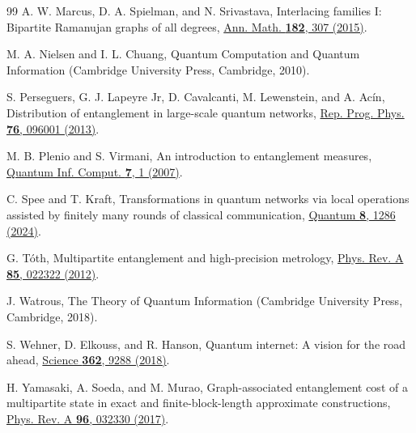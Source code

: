 \documentclass[a4paper,onecolumn,accepted=2024-12-14]{quantumarticle}
\theoremstyle{plain}
\begin{document}
\begin{thebibliography}{99}
 A. W. Marcus, D. A. Spielman, and N. Srivastava, Interlacing families I: Bipartite Ramanujan graphs of all degrees, \href{https://doi.org/10.4007/annals.2015.182.1.7}{Ann. Math. \textbf{182}, 307 (2015)}.
    
 M. A. Nielsen and I. L. Chuang, Quantum Computation and Quantum Information (Cambridge University Press, Cambridge, 2010).

 S. Perseguers, G. J. Lapeyre Jr, D. Cavalcanti, M. Lewenstein, and A. Ac\'{i}n, Distribution of entanglement in large-scale quantum networks, \href{https://doi.org/10.1088/0034-4885/76/9/096001}{Rep. Prog. Phys. \textbf{76}, 096001 (2013)}.
    
 M. B. Plenio and S. Virmani, An introduction to entanglement measures, \href{https://doi.org/10.26421/QIC7.1-2-1}{Quantum Inf. Comput. \textbf{7}, 1 (2007)}.

 C. Spee and T. Kraft, Transformations in quantum networks via local operations assisted by finitely many rounds of classical communication, \href{https://doi.org/10.22331/q-2024-03-14-1286}{Quantum \textbf{8}, 1286 (2024)}.
    
 G. T\'{o}th, Multipartite entanglement and high-precision metrology, \href{https://doi.org/10.1103/PhysRevA.85.022322}{Phys. Rev. A \textbf{85}, 022322 (2012)}.

 J. Watrous, The Theory of Quantum Information (Cambridge University Press, Cambridge, 2018).

 S. Wehner, D. Elkouss, and R. Hanson, Quantum internet: A vision for the road ahead, \href{https://doi.org/10.1126/science.aam9288}{Science \textbf{362}, 9288 (2018)}.

 H. Yamasaki, A. Soeda, and M. Murao, Graph-associated entanglement cost of a multipartite state in exact and finite-block-length approximate constructions, \href{https://doi.org/10.1103/PhysRevA.96.032330}{Phys. Rev. A \textbf{96}, 032330 (2017)}.

\end{thebibliography}
\end{document}
